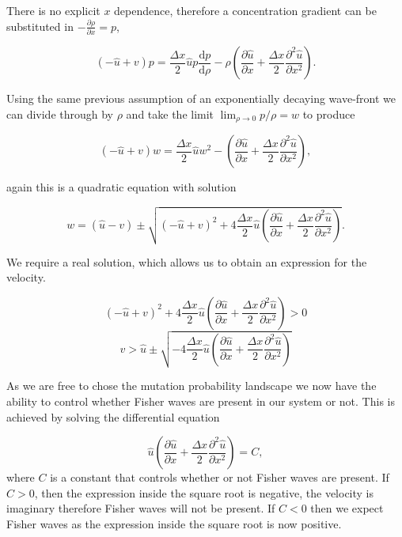 \documentclass[12pt, a4paper,]{article}
\begin{document}
There is no explicit $x$ dependence, therefore a concentration gradient can be substituted in $- \frac{\partial \rho}{\partial x} = p$,

\begin{equation}
(- \hat{u} + v ) p  = \frac{\Delta x }{2} \hat{u} p \frac{\mathrm{d} p }{\mathrm{d} \rho} - \rho \left( \frac{\partial \hat{u}}{\partial x} + \frac{\Delta x}{2} \frac{\partial ^2 \hat{u}}{\partial x^2} \right).
\end{equation}

Using the same previous assumption of an exponentially decaying wave-front we can divide through by $\rho$ and take the limit $\lim _{\rho \rightarrow 0} p / \rho = w$ to produce

\begin{equation}
(- \hat{u} + v ) w  = \frac{\Delta x}{2} \hat{u} w ^2 - \left( \frac{\partial \hat{u}}{\partial x} + \frac{\Delta x}{2} \frac{\partial ^2 \hat{u}}{\partial x ^2} \right),
\end{equation}

again this is a quadratic equation with solution

\begin{equation}
w  = (\hat{u} - v ) \pm \sqrt{(- \hat{u} + v )^2 + 4 \frac{\Delta x}{2} \hat{u} \left( \frac{\partial \hat{u}}{\partial x} + \frac{\Delta x}{2} \frac{\partial ^2 \hat{u}}{\partial x ^2} \right) }.
\end{equation}

We require a real solution, which allows us to obtain an expression for the velocity. 

\begin{equation}
(- \hat{u} + v )^2 + 4 \frac{\Delta x}{2} \hat{u} \left( \frac{\partial \hat{u}}{\partial x} + \frac{\Delta x}{2} \frac{\partial ^2 \hat{u}}{\partial x ^2} \right)  > 0
\end{equation}
\begin{equation}
v  > \hat{u} \pm  \sqrt{- 4 \frac{\Delta x}{2} \hat{u} \left( \frac{\partial \hat{u}}{\partial x} + \frac{\Delta x}{2} \frac{\partial ^2 \hat{u}}{\partial x ^2} \right) }
\end{equation}

As we are free to chose the mutation probability landscape we now have the ability to control whether Fisher waves are present in our system or not. This is achieved by solving the differential equation 

\begin{equation}
\hat{u} \left( \frac{\partial \hat{u}}{\partial x} + \frac{\Delta x}{2} \frac{\partial ^2 \hat{u}}{\partial x ^2} \right) = C ,
\end{equation}
where $C$ is a constant that controls whether or not Fisher waves are present. If $C > 0$, then the expression inside the square root is negative, the velocity is imaginary therefore Fisher waves will not be present. If $C<0$ then we expect Fisher waves as the expression inside the square root is now positive. 
\end{document}
